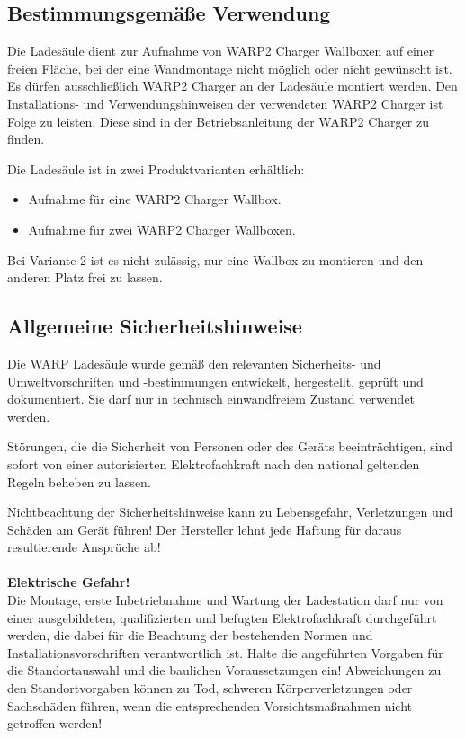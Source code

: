 \documentclass[a4paper,10pt]{article}
\newcommand{\warn}[1]{\begin{tcolorbox}[colback=boxred,colframe=red,coltext=
white,title=Warnung]#1\end{tcolorbox}}
\begin{document}
\begin{multicols*}{2}
	\subsection{Bestimmungsgemäße Verwendung}
	Die Ladesäule dient zur Aufnahme von WARP2 Charger Wallboxen auf einer freien
	Fläche, bei der eine Wandmontage nicht möglich oder nicht gewünscht ist. 
	Es dürfen ausschließlich WARP2 Charger
	an der Ladesäule montiert werden. Den Installations- und
	Verwendungshinweisen der verwendeten WARP2 Charger ist Folge zu leisten.
	Diese sind in der Betriebsanleitung der WARP2 Charger zu finden.

	Die Ladesäule ist in zwei Produktvarianten erhältlich:
	\begin{itemize}
		\item Aufnahme für eine WARP2 Charger Wallbox.
		\item Aufnahme für zwei WARP2 Charger Wallboxen.
	\end{itemize}

	Bei Variante 2 ist es nicht zulässig, nur eine Wallbox zu montieren und den anderen Platz frei zu lassen.
\vspace{-0.2cm}
	\subsection{Allgemeine Sicherheitshinweise}

	Die WARP Ladesäule wurde gemäß den relevanten Sicherheits- und Umweltvorschriften und -bestimmungen
	entwickelt, hergestellt, geprüft und dokumentiert. Sie darf nur in technisch einwandfreiem Zustand verwendet werden.

	Störungen, die die Sicherheit von Personen oder des Geräts beeinträchtigen,
	sind sofort von einer autorisierten Elektrofachkraft nach den national geltenden Regeln beheben zu lassen.

	\warn{Nichtbeachtung der Sicherheitshinweise kann zu Lebensgefahr,
	Verletzungen und Schäden am Gerät führen! Der Hersteller lehnt jede Haftung
	für daraus resultierende Ansprüche ab!
	\\
	\\
	\textbf{Elektrische Gefahr!}\\
	Die Montage, erste Inbetriebnahme und Wartung der Ladestation darf nur von
	einer ausgebildeten, qualifizierten und befugten Elektrofachkraft
	durchgeführt werden, die dabei für die Beachtung der bestehenden Normen und
	Installationsvorschriften verantwortlich ist. Halte die angeführten Vorgaben 
	für die Standortauswahl und die baulichen Voraussetzungen ein! Abweichungen 
	zu den Standortvorgaben können zu Tod, schweren Körperverletzungen oder 
	Sachschäden führen, wenn die entsprechenden Vorsichtsmaßnahmen nicht 
	getroffen werden!
	}


\end{multicols*}
\end{document}
